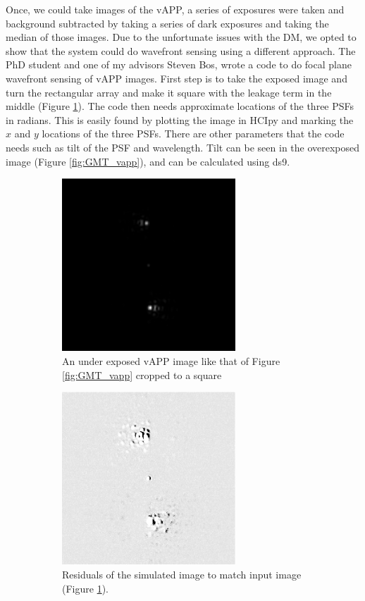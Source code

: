 Once, we could take images of the vAPP, a series of exposures were taken and background subtracted by taking a series of dark exposures and taking the median of those images.  Due to the unfortunate issues with the DM, we opted to show that the system could do wavefront sensing using a different approach.  The PhD student and one of my advisors Steven Bos, wrote a code to do focal plane wavefront sensing of vAPP images.  First step is to take the exposed image and turn the rectangular array and make it square with the leakage term in the middle (Figure \ref{fig:square_vapp}).  The code then needs approximate locations of the three PSFs in radians.  This is easily found by plotting the image in HCIpy and marking the $x$ and $y$ locations of the three PSFs.  There are other parameters that the code needs such as tilt of the PSF and wavelength.  Tilt can be seen in the overexposed image (Figure \ref{fig:GMT_vapp}), and can be calculated using ds9.

\begin{figure}[H]
\centering
\begin{subfigure}{.5\textwidth}
  \centering
  \includegraphics[width=6.5cm]{Figures/vapp_square.png}
  \caption{An under exposed vAPP image like that of Figure \ref{fig:GMT_vapp} cropped to a square}
  \label{fig:square_vapp}
\end{subfigure}%
\begin{subfigure}{.5\textwidth}
  \centering
  \includegraphics[width=6.5cm]{Figures/residual.png}
  \caption{Residuals of the simulated image to match input image (Figure \ref{fig:square_vapp}).}
  \label{fig:sim_square}
\end{subfigure}
\caption{}
\label{fig:code_images}
\end{figure}


